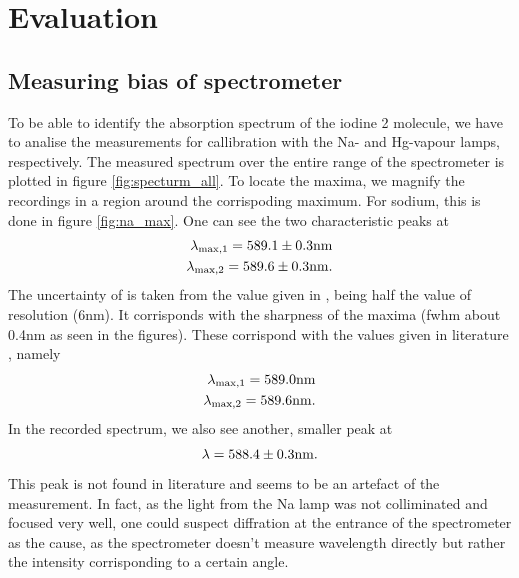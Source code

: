 \section{Evaluation}

\subsection{Measuring bias of spectrometer}
To be able to identify the absorption spectrum of the iodine 2 molecule, we have to analise 
the measurements for callibration with the Na- and Hg-vapour lamps, respectively. The measured
spectrum over the entire range of the spectrometer is plotted in figure \ref{fig:specturm_all}. 
To locate the maxima, we magnify the recordings in a region around the corrispoding maximum. 
For sodium, this is done in figure \ref{fig:na_max}. One can see the two characteristic peaks 
at 
\begin{eqnarray*}
    \lambda_\mathrm{max, 1} = 589.1 \pm 0.3 \mathrm{nm} \\
    \lambda_\mathrm{max, 2} = 589.6 \pm 0.3 \mathrm{nm}.
\end{eqnarray*}
The uncertainty of \unc is taken from the value given in \cite{}, being half the value of 
resolution (6nm). It corrisponds with the sharpness of the maxima 
(fwhm about 0.4nm as seen in the figures). 
These corrispond with the values given in literature \cite{}, namely 
\begin{eqnarray*}
    \lambda_\mathrm{max, 1} = 589.0 \mathrm{nm} \\
    \lambda_\mathrm{max, 2} = 589.6 \mathrm{nm}.
\end{eqnarray*}
In the recorded spectrum, we also see another, smaller peak at 
\begin{equation}
    \lambda = 588.4 \pm 0.3 \mathrm{nm}.
\end{equation} 
This peak is not found in literature \cite{nist} and seems to be an artefact of the measurement. 
In fact, as the light from the Na lamp was not colliminated and focused very well, one could 
suspect diffration at the entrance of the spectrometer as the cause, as the spectrometer 
doesn't measure wavelength directly but rather the intensity corrisponding to a certain angle. 

